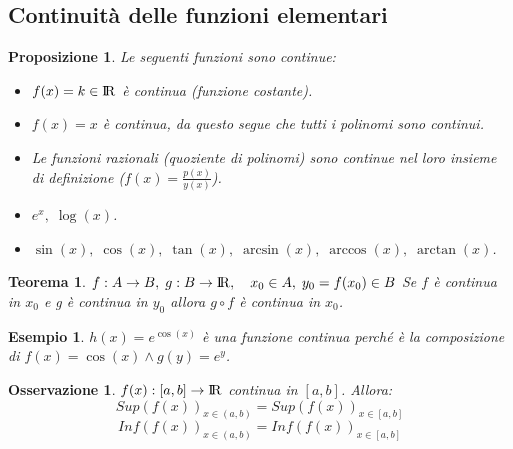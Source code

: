 \documentclass[12pt, a4paper]{article}
\theoremstyle{break}
\newtheorem{theorem}{Teorema}[subsection]
\newtheorem{proposition}{Proposizione}[subsection]
\newtheorem{example}{Esempio}[subsection]
\newtheorem{observation}{Osservazione}[subsection]
\newcommand\R{{\rm I\!R}}
\begin{document}
    \subsection{Continuità delle funzioni elementari}
    \begin{proposition}
        Le seguenti funzioni sono continue:
        \begin{itemize}
            \item $f(x) = k\in\R$ è continua (funzione costante).
            \item $f(x) = x$ è continua, da questo segue che tutti i polinomi sono continui.
            \item Le funzioni razionali (quoziente di polinomi) sono continue nel loro insieme di definizione ($f(x) = \frac{p(x)}{y(x)}$).
            \item $e^x,\; \log(x)$.
            \item $\sin (x),\; \cos(x),\; \tan(x),\; \arcsin(x),\; \arccos(x),\; \arctan(x)$.
        \end{itemize}
    \end{proposition}
    \begin{theorem}
        $f:A\rightarrow B,\; g:B\rightarrow\R,\quad x_0\in A,\; y_0 = f(x_0) \in B$\newline
        Se $f$ è continua in $x_0$ e g è continua in $y_0$ allora $g \circ f$ è continua in $x_0$.
    \end{theorem}
    \begin{example}
        $h(x) = e^{\cos(x)}$ è una funzione continua perché è la composizione di $f(x) = \cos(x) \wedge g(y) = e^y$.
    \end{example}
    \begin{observation}
        $f(x): [a,b]\rightarrow\R$ continua in $[a,b]$. Allora:
        \[Sup(f(x))_{x\in(a,b)} = Sup(f(x))_{x\in [a,b]}\]
        \[Inf(f(x))_{x\in(a,b)} = Inf(f(x))_{x\in [a,b]}\]
    \end{observation}
\end{document}
